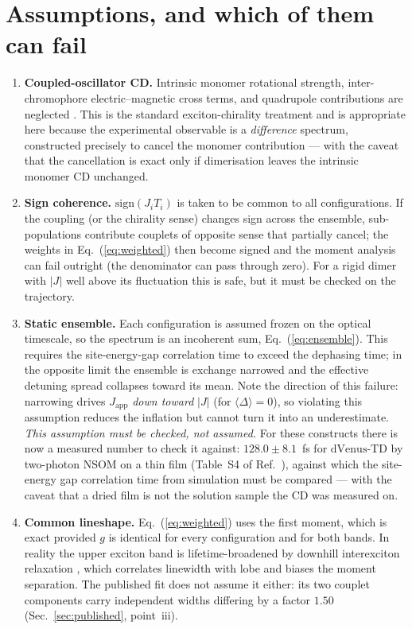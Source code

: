 \documentclass[11pt,a4paper]{article}
\begin{document}
\section{Assumptions, and which of them can fail}

\begin{enumerate}
\item \textbf{Coupled-oscillator CD.} Intrinsic monomer rotational strength,
inter-chromophore electric--magnetic cross terms, and quadrupole contributions
are neglected \cite{tinoco1962,jurinovich2014}. This is the standard
exciton-chirality treatment and is appropriate here because the experimental
observable is a \emph{difference} spectrum, constructed precisely to cancel
the monomer contribution --- with the caveat that the cancellation is exact
only if dimerisation leaves the intrinsic monomer CD unchanged.

\item \textbf{Sign coherence.} $\mathrm{sign}(J_{i}T_{i})$ is taken to be
common to all configurations. If the coupling (or the chirality sense) changes
sign across the ensemble, sub-populations contribute couplets of opposite
sense that partially cancel; the weights in Eq.~(\ref{eq:weighted}) then
become signed and the moment analysis can fail outright (the denominator can
pass through zero). For a rigid dimer with $|J|$ well above its fluctuation
this is safe, but it must be checked on the trajectory.

\item \textbf{Static ensemble.} Each configuration is assumed frozen on the
optical timescale, so the spectrum is an incoherent sum,
Eq.~(\ref{eq:ensemble}). This requires the site-energy-gap correlation time to
exceed the dephasing time; in the opposite limit the ensemble is exchange
narrowed \cite{knapp1984} and the effective detuning spread collapses toward
its mean. Note the direction of this failure: narrowing drives
$J_{\mathrm{app}}$ \emph{down toward} $|J|$ (for $\langle\Delta\rangle=0$), so
violating this assumption reduces the inflation but cannot turn it into an
underestimate. \emph{This assumption must be checked, not assumed.} For these
constructs there is now a measured number to check it against: $128.0\pm8.1$~fs
for $\mathrm{dVenus\mbox{-}TD}$ by two-photon NSOM on a thin film (Table~S4 of
Ref.~\cite{nguyen2025}), against which the site-energy gap correlation time
from simulation must be compared --- with the caveat that a dried film is not
the solution sample the CD was measured on.

\item \textbf{Common lineshape.} Eq.~(\ref{eq:weighted}) uses the first
moment, which is exact provided $g$ is identical for every configuration and
for both bands. In reality the upper exciton band is lifetime-broadened by
downhill interexciton relaxation \cite{renger2002}, which correlates linewidth
with lobe and biases the moment separation. The published fit does not assume
it either: its two couplet components carry independent widths differing by a
factor $1.50$ (Sec.~\ref{sec:published}, point~iii).


\end{enumerate}
\end{document}
